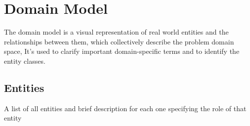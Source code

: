 \documentclass[]{uc2pfecaneva}
\begin{document}
    \begin{table}
        \raggedright\section{Domain Model}
        The domain model is a visual representation of real world entities and the relationships between them, which collectively describe the problem domain space, It's used to clarify important domain-specific terms and to identify the entity classes.
        \raggedright\subsection{Entities}
        A list of all entities and brief description for each one specifying the role of that entity\linebreak \\


\end{table}
\end{document}
